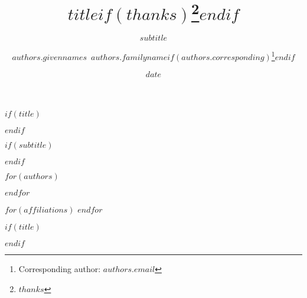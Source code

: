 \documentclass[11pt]{article}
\begin{document}
$if(title)$
\title{$title$$if(thanks)$\thanks{$thanks$}$endif$}
$endif$

$if(subtitle)$
\subtitle{$subtitle$}
$endif$

$for(authors)$
\author[$for(authors.affiliations)$$authors.affiliations$$sep$,$endfor$]{$authors.givennames$~$authors.familyname$$if(authors.corresponding)$\thanks{Corresponding author: $authors.email$}$endif$}
$endfor$

$for(affiliations)$
$endfor$

\date{$date$}

$if(title)$
\maketitle
$endif$
\end{document}
